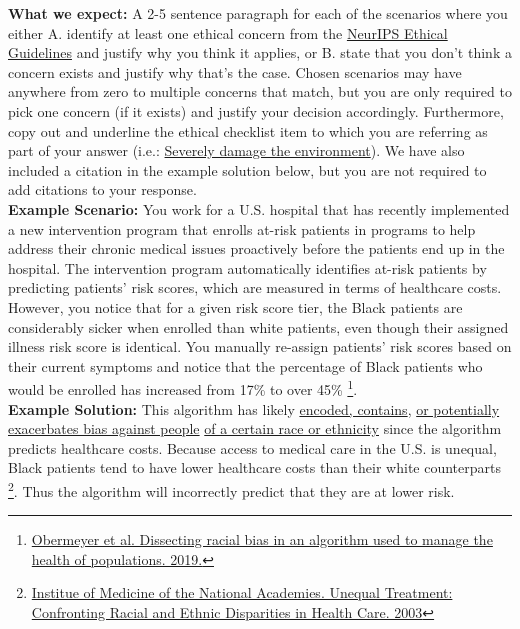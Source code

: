 \textbf{What we expect:} A 2-5 sentence paragraph for each of the scenarios where you either A. identify at least one ethical concern from the \href{https://neurips.cc/public/EthicsGuidelines}{NeurIPS Ethical Guidelines} and justify why you think it applies, or B. state that you don’t think a concern exists and justify why that’s the case. Chosen scenarios may have anywhere from zero to multiple concerns that match, but you are only required to pick one concern (if it exists) and justify your decision accordingly. Furthermore, copy out and underline the ethical checklist item to which you are referring as part of your answer (i.e.: \underline{Severely damage the environment}). We have also included a citation in the example solution below, but you are not required to add citations to your response.\\

\textbf{Example Scenario:} You work for a U.S. hospital that has recently implemented a new intervention program that enrolls at-risk patients in programs to help address their chronic medical issues proactively before the patients end up in the hospital. The intervention program automatically identifies at-risk patients by predicting patients’ risk scores, which are measured in terms of healthcare costs. However, you notice that for a given risk score tier, the Black patients are considerably sicker when enrolled than white patients, even though their assigned illness risk score is identical. You manually re-assign patients’ risk scores based on their current symptoms and notice that the percentage of Black patients who would be enrolled has increased from 17\%  to over 45\% \footnote{\href{https://doi.org/10.1126/science.aax2342}{Obermeyer et al. Dissecting racial bias in an algorithm used to manage the health of populations. 2019.}}.\\

\textbf{Example Solution:} This algorithm has likely \underline{encoded, contains}, \underline{or potentially exacerbates bias against people} \underline{of a certain race or ethnicity} since the algorithm predicts healthcare costs. Because access to medical care in the U.S. is unequal, Black patients tend to have lower healthcare costs than their white counterparts \footnote{\href{https://www.nap.edu/catalog/10260/unequal-treatment-confronting-racial-and-ethnic-disparities-in-health-care}{Institue of Medicine of the National Academies. Unequal Treatment:
Confronting Racial and Ethnic Disparities in Health Care. 2003}}. Thus the algorithm will incorrectly predict that they are at lower risk.\\

\begin{enumerate}

  

  

  

  

\end{enumerate}
